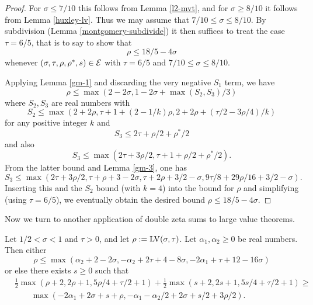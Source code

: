 \begin{proof} For $\sigma \leq 7/10$ this follows from Lemma \ref{l2-mvt}, and for $\sigma \geq 8/10$ it follows from Lemma \ref{huxley-lv}.  Thus we may assume that $7/10 \leq \sigma \leq 8/10$.  By subdivision (Lemma \ref{montgomery-subdivide}) it then suffices to treat the case $\tau = 6/5$, that is to say to show that
    $$ \rho \leq 18/5-4\sigma$$
whenever $(\sigma,\tau,\rho,\rho^*,s) \in \mathcal{E}$ with $\tau=6/5$ and $7/10 \leq \sigma \leq 8/10$.

Applying Lemma \ref{gm-1} and discarding the very negative $S_1$ term, we have
$$ \rho \leq \max(2-2\sigma, 1-2\sigma + \max(S_2, S_3)/3)$$
where $S_2, S_3$ are real numbers with
$$ S_2 \leq \max(2+2\rho, \tau+1+(2-1/k) \rho, 2 + 2\rho + (\tau/2 - 3\rho/4)/k )$$
for any positive integer $k$ and
$$ S_3 \leq 2\tau + \rho/2 + \rho^*/2$$
and also
$$ S_3 \leq \max( 2\tau + 3\rho/2, \tau+1+\rho/2+\rho^*/2).$$
From the latter bound and Lemma \ref{gm-3}, one has
$$ S_3 \leq \max( 2\tau+3\rho/2, \tau+\rho+3-2\sigma, \tau+2\rho+3/2-\sigma, 9\tau/8+29\rho/16 + 3/2-\sigma).$$
Inserting this and the $S_2$ bound (with $k=4$) into the bound for $\rho$ and simplifying (using $\tau=6/5$), we eventually obtain
the desired bound $\rho \leq 18/5-4\sigma$.
\end{proof}

Now we turn to another application of double zeta sums to large value theorems.

    \begin{theorem}\label{bourgain-lvt} \cite{bourgain_large_2000} Let $1/2 < \sigma < 1$ and $\tau > 0$, and let $\rho := \mathrm{LV}(\sigma,\tau)$.  Let $\alpha_1, \alpha_2 \geq 0$ be real numbers.  Then either
    \begin{equation}\label{rho1}
     \rho \leq \max( \alpha_2 + 2 - 2 \sigma, -\alpha_2 + 2\tau+4-8\sigma, -2\alpha_1 + \tau + 12 - 16 \sigma)
    \end{equation}
    or else there exists $s \geq 0$ such that
    \begin{equation}\label{rs}
    \begin{split}
         &\frac{1}{2}\max(\rho+2, 2\rho+1, 5\rho/4 + \tau/2 + 1) + \frac{1}{2}\max(s+2, 2s+1, 5s/4 + \tau/2 + 1) \geq \\
            &\qquad\max( -2\alpha_1 + 2\sigma + s + \rho, -\alpha_1 - \alpha_2/2 + 2\sigma + s/2 + 3\rho/2).
    \end{split}
    \end{equation}
    \end{theorem}

